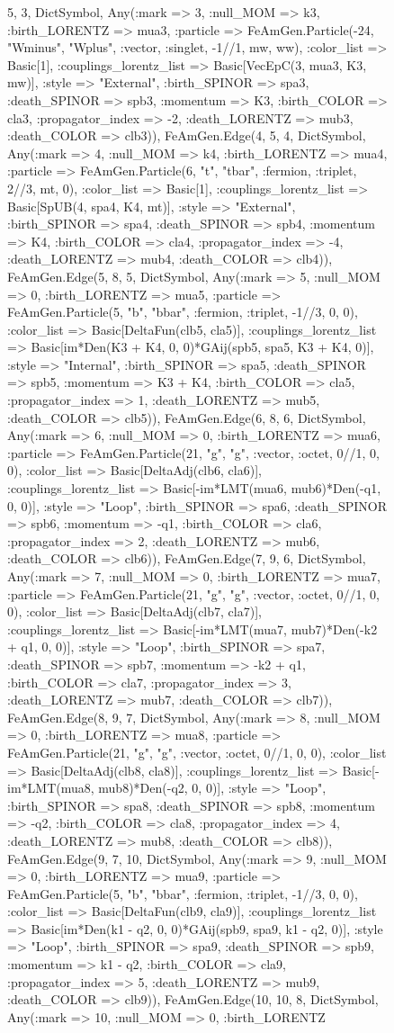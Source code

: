 \documentclass{revtex4}
\begin{document}
\begin{figure}[!htb]
\begin{center}
{5, 3, Dict{Symbol, Any}(:mark => 3, :null_MOM => k3, :birth_LORENTZ => mua3, :particle => FeAmGen.Particle(-24, "Wminus", "Wplus", :vector, :singlet, -1//1, mw, ww), :color_list => Basic[1], :couplings_lorentz_list => Basic[VecEpC(3, mua3, K3, mw)], :style => "External", :birth_SPINOR => spa3, :death_SPINOR => spb3, :momentum => K3, :birth_COLOR => cla3, :propagator_index => -2, :death_LORENTZ => mub3, :death_COLOR => clb3)), FeAmGen.Edge(4, 5, 4, Dict{Symbol, Any}(:mark => 4, :null_MOM => k4, :birth_LORENTZ => mua4, :particle => FeAmGen.Particle(6, "t", "tbar", :fermion, :triplet, 2//3, mt, 0), :color_list => Basic[1], :couplings_lorentz_list => Basic[SpUB(4, spa4, K4, mt)], :style => "External", :birth_SPINOR => spa4, :death_SPINOR => spb4, :momentum => K4, :birth_COLOR => cla4, :propagator_index => -4, :death_LORENTZ => mub4, :death_COLOR => clb4)), FeAmGen.Edge(5, 8, 5, Dict{Symbol, Any}(:mark => 5, :null_MOM => 0, :birth_LORENTZ => mua5, :particle => FeAmGen.Particle(5, "b", "bbar", :fermion, :triplet, -1//3, 0, 0), :color_list => Basic[DeltaFun(clb5, cla5)], :couplings_lorentz_list => Basic[im*Den(K3 + K4, 0, 0)*GAij(spb5, spa5, K3 + K4, 0)], :style => "Internal", :birth_SPINOR => spa5, :death_SPINOR => spb5, :momentum => K3 + K4, :birth_COLOR => cla5, :propagator_index => 1, :death_LORENTZ => mub5, :death_COLOR => clb5)), FeAmGen.Edge(6, 8, 6, Dict{Symbol, Any}(:mark => 6, :null_MOM => 0, :birth_LORENTZ => mua6, :particle => FeAmGen.Particle(21, "g", "g", :vector, :octet, 0//1, 0, 0), :color_list => Basic[DeltaAdj(clb6, cla6)], :couplings_lorentz_list => Basic[-im*LMT(mua6, mub6)*Den(-q1, 0, 0)], :style => "Loop", :birth_SPINOR => spa6, :death_SPINOR => spb6, :momentum => -q1, :birth_COLOR => cla6, :propagator_index => 2, :death_LORENTZ => mub6, :death_COLOR => clb6)), FeAmGen.Edge(7, 9, 6, Dict{Symbol, Any}(:mark => 7, :null_MOM => 0, :birth_LORENTZ => mua7, :particle => FeAmGen.Particle(21, "g", "g", :vector, :octet, 0//1, 0, 0), :color_list => Basic[DeltaAdj(clb7, cla7)], :couplings_lorentz_list => Basic[-im*LMT(mua7, mub7)*Den(-k2 + q1, 0, 0)], :style => "Loop", :birth_SPINOR => spa7, :death_SPINOR => spb7, :momentum => -k2 + q1, :birth_COLOR => cla7, :propagator_index => 3, :death_LORENTZ => mub7, :death_COLOR => clb7)), FeAmGen.Edge(8, 9, 7, Dict{Symbol, Any}(:mark => 8, :null_MOM => 0, :birth_LORENTZ => mua8, :particle => FeAmGen.Particle(21, "g", "g", :vector, :octet, 0//1, 0, 0), :color_list => Basic[DeltaAdj(clb8, cla8)], :couplings_lorentz_list => Basic[-im*LMT(mua8, mub8)*Den(-q2, 0, 0)], :style => "Loop", :birth_SPINOR => spa8, :death_SPINOR => spb8, :momentum => -q2, :birth_COLOR => cla8, :propagator_index => 4, :death_LORENTZ => mub8, :death_COLOR => clb8)), FeAmGen.Edge(9, 7, 10, Dict{Symbol, Any}(:mark => 9, :null_MOM => 0, :birth_LORENTZ => mua9, :particle => FeAmGen.Particle(5, "b", "bbar", :fermion, :triplet, -1//3, 0, 0), :color_list => Basic[DeltaFun(clb9, cla9)], :couplings_lorentz_list => Basic[im*Den(k1 - q2, 0, 0)*GAij(spb9, spa9, k1 - q2, 0)], :style => "Loop", :birth_SPINOR => spa9, :death_SPINOR => spb9, :momentum => k1 - q2, :birth_COLOR => cla9, :propagator_index => 5, :death_LORENTZ => mub9, :death_COLOR => clb9)), FeAmGen.Edge(10, 10, 8, Dict{Symbol, Any}(:mark => 10, :null_MOM => 0, :birth_LORENTZ }
\end{center}
\end{figure}
\end{document}
